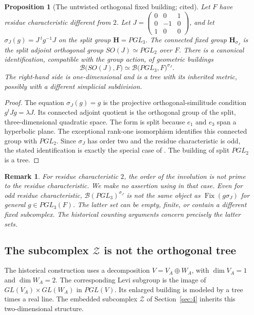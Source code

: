 \documentclass[12pt,letterpaper]{amsart}
\numberwithin{equation}{section}
\newtheorem{proposition}[theorem]{Proposition}
\newtheorem{remark}{Remark}
\theoremstyle{definition}
\theoremstyle{plain}
\begin{document}
\begin{proposition}[The untwisted orthogonal fixed building; cited]
\label{prop:new-PY}
Let $F$ have residue characteristic different from $2$. Let
$J=\left(\begin{smallmatrix}0&0&1\\0&-1&0\\1&0&0\end{smallmatrix}\right)$,
and let $\sigma_J(g)=J\,{}^tg^{-1}J$ on the split group
$\mathbf H=PGL_3$. The connected fixed group
$\mathbf H_{\sigma_J}$ is the split adjoint orthogonal group
$SO(J)\simeq PGL_2$ over $F$. There is a canonical identification,
compatible with the group action, of geometric buildings
\[
 \mathcal B\bigl(SO(J),F\bigr)
 \simeq \mathcal B\bigl(PGL_3,F\bigr)^{\sigma_J}.
\]
The right-hand side is one-dimensional and is a tree with its
inherited metric, possibly with a different simplicial subdivision.
\end{proposition}
\begin{proof}
The equation $\sigma_J(g)=g$ is the projective orthogonal-similitude
condition $g^tJg=\lambda J$. Its connected adjoint quotient is the
orthogonal group of the split, three-dimensional quadratic space.
The form is split because $e_1$ and $e_3$ span a hyperbolic plane.
The exceptional rank-one isomorphism identifies this connected group
with $PGL_2$. Since $\sigma_J$ has order two and the residue
characteristic is odd, the stated identification is exactly the
special case of \cite[Theorem~1.9]{PY02}. The building of split
$PGL_2$ is a tree.
\end{proof}

\begin{remark}
For residue characteristic $2$, the order of the involution is not
prime to the residue characteristic. We make no assertion using
\cite{PY02} in that case. Even for odd residue characteristic,
$\mathcal B(PGL_3)^{\sigma_J}$ is not the same object as
$\operatorname{Fix}(g\sigma_J)$ for general $g\in PGL_3(F)$.
The latter set can be empty, finite, or contain a different fixed
subcomplex. The historical counting arguments concern precisely the
latter sets.
\end{remark}

\subsection{The subcomplex $\mathcal Z$ is not the orthogonal tree}
The historical construction uses a decomposition
$V=V_A\oplus W_A$, with $\dim V_A=1$ and $\dim W_A=2$.
The corresponding Levi subgroup is the image of
$GL(V_A)\times GL(W_A)$ in $PGL(V)$. Its enlarged building is modeled
by a tree times a real line. The embedded subcomplex $\mathcal Z$
of Section~\ref{sec:4} inherits this two-dimensional structure.
\end{document}

